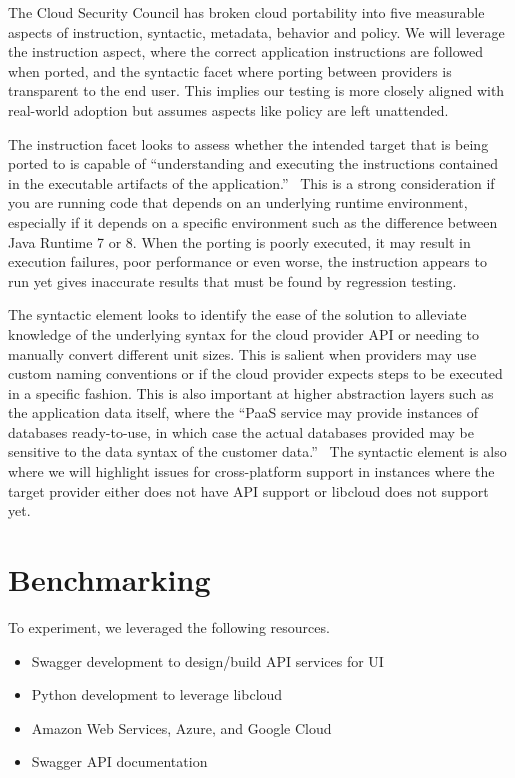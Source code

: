 The Cloud Security Council has broken cloud portability into five measurable
aspects of instruction, syntactic, metadata, behavior and policy. We will
leverage the instruction aspect, where the correct application instructions are
followed when ported, and the syntactic facet where porting between providers is
transparent to the end user. This implies our testing is more closely aligned
with real-world adoption but assumes aspects like policy are left
unattended.~\cite{hid-sp18-518-Cloud-Council}

The instruction facet looks to assess whether the intended target that is being
ported to is capable of ``understanding and executing the instructions contained
in the executable artifacts of the
application.''~\cite{hid-sp18-518-Cloud-Council} This is a strong consideration
if you are running code that depends on an underlying runtime environment,
especially if it depends on a specific environment such as the difference
between Java Runtime 7 or 8. When the porting is poorly executed, it may result
in execution failures, poor performance or even worse, the instruction appears
to run yet gives inaccurate results that must be found by regression testing.

The syntactic element looks to identify the ease of the solution to alleviate
knowledge of the underlying syntax for the cloud provider API or needing to
manually convert different unit sizes. This is salient when providers may use
custom naming conventions or if the cloud provider expects steps to be executed
in a specific fashion. This is also important at higher abstraction layers such
as the application data itself, where the ``PaaS service may provide instances
of databases ready-to-use, in which case the actual databases provided may be
sensitive to the data syntax of the customer
data.''~\cite{hid-sp18-518-Cloud-Council} The syntactic element is also where we
will highlight issues for cross-platform support in instances where the target
provider either does not have API support or libcloud does not support yet.

\section{Benchmarking}

To experiment, we leveraged the following resources.

\begin{itemize}

\item Swagger development to design/build API services for UI
\item Python development to leverage libcloud
\item Amazon Web Services, Azure, and Google Cloud
\item Swagger API documentation
 
\end{itemize}


